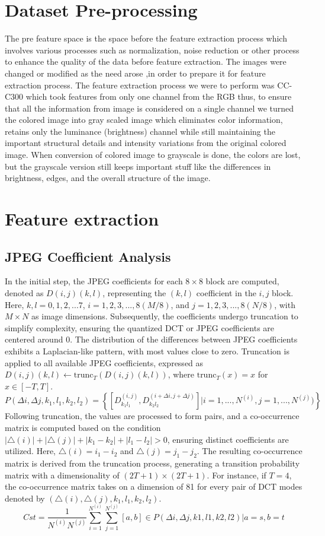 \clearpage
\section{Dataset Pre-processing}
The pre feature space is the space before the feature extraction process which involves various processes such as normalization, noise reduction or other process to enhance the quality of the data before feature extraction.
The images were changed or modified as the need arose ,in order to prepare it for feature extraction process. The feature extraction process we were to perform was CC-C300 which took features from only one channel from the RGB thus, to ensure that all the information from image is considered on a single channel we turned the colored image into gray scaled image which 
eliminates color information, retains only the luminance (brightness) channel while still maintaining the important structural details and intensity variations from the original colored image. When conversion of colored image to grayscale is done, the colors are lost, but the grayscale version still keeps important stuff like the differences in brightness, edges, and the overall structure of the image.
\section{Feature extraction}
\subsection{JPEG Coefficient Analysis}
In the initial step, the JPEG coefficients for each $8 \times 8$ block are computed, denoted as $D(i,j)(k,l)$, representing the $(k, l)$ coefficient in the $i, j$ block. Here, $k, l = 0, 1, 2, ...7$, $i = 1, 2, 3, ..., 8(M/8)$, and $j = 1, 2, 3, ..., 8(N/8)$, with $M \times N$ as image dimensions. Subsequently, the coefficients undergo truncation to simplify complexity, ensuring the quantized DCT or JPEG coefficients are centered around 0.
The distribution of the differences between JPEG coefficients exhibits a Laplacian-like pattern, with most values close to zero. Truncation is applied to all available JPEG coefficients, expressed as $D(i,j)(k,l) \leftarrow \text{trunc}_T(D(i,j)(k,l))$, where $\text{trunc}_T(x) = x$ for $x \in [-T, T]$.
\[
    P(\Delta i, \Delta j,k_1,l_1,k_2,l_2)=\left \{ \left [ D^{(i,j)}_{k_1l_1},D^{(i+\Delta i,j+\Delta j)}_{k_2l_2} \right ] \vert i=1,...,N^{(i)}, j=1,...,N^{(j)})\right \}
\]
Following truncation, the values are processed to form pairs, and a co-occurrence matrix is computed based on the condition $|\triangle(i)| + |\triangle(j)| + |k_1 - k_2| + |l_1 - l_2| > 0$, ensuring distinct coefficients are utilized. Here, $\triangle(i) = i_1 - i_2$ and $\triangle(j) = j_1 - j_2$. The resulting co-occurrence matrix is derived from the truncation process, generating a transition probability matrix with a dimensionality of $(2T + 1) \times (2T + 1)$. For instance, if $T = 4$, the co-occurrence matrix takes on a dimension of 81 for every pair of DCT modes denoted by $(\triangle(i), \triangle(j), k_1, l_1, k_2, l_2)$.
\[
    Cst = \frac{1}{N^{(i)}N^{(j)}} \sum_{i=1}^{N^{(i)}} \sum_{j=1}^{N^{(j)}} \left[ a, b \right] \in P (\Delta i, \Delta j, k1, l1, k2, l2) | a = s, b = t
\]

